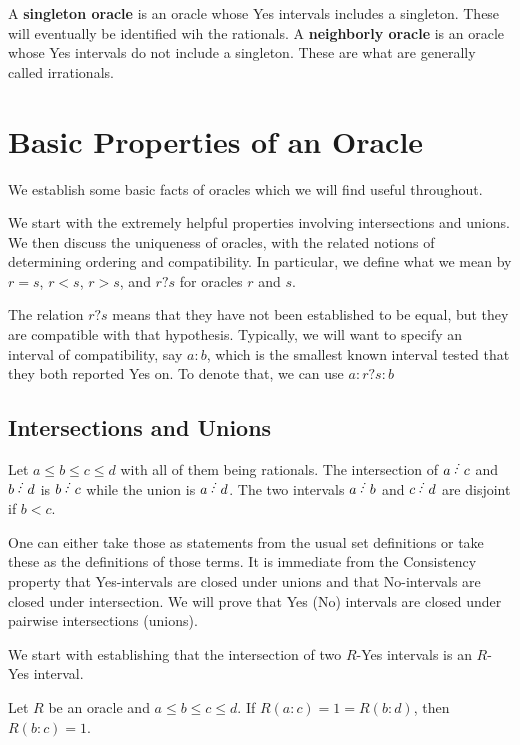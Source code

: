 \documentclass[12pt]{article}
\begin{document}
A \textbf{singleton oracle }is an oracle whose Yes intervals includes a singleton. These will eventually be identified wih the rationals. A \textbf{neighborly oracle} is an oracle whose Yes intervals do not include a singleton. These are what are generally called irrationals. 



\section{Basic Properties of an Oracle}

We establish some basic facts of oracles which we will find useful throughout. 

We start with the extremely helpful properties involving intersections and unions. We then discuss the uniqueness of oracles, with the related notions of determining ordering and compatibility. In particular, we define what we mean by $r = s$, $r<s$, $r>s$, and $r?s$ for oracles $r$ and $s$. 

The relation $r?s$ means that they have not been established to be equal, but they are compatible with that hypothesis. Typically, we will want to specify an interval of compatibility, say $a:b$, which is the smallest known interval tested that they both reported Yes on. To denote that, we can use $a:r?s:b$ 

\subsection{Intersections and Unions}

Let $a \leq b \leq c \leq d$ with all of them being rationals. The intersection of $a\lte c$ and $b\lte d$ is $b\lte c$ while the union is $a\lte d$. The two intervals $a\lte b$ and $c\lte d$ are disjoint if $b < c$. 

One can either take those as statements from the usual set definitions or take these as the definitions of those terms. It is immediate from the Consistency property that Yes-intervals are closed under unions and that No-intervals are closed under intersection. We will prove that Yes (No) intervals are closed under pairwise intersections (unions). 

We start with establishing that the intersection of two $R$-Yes intervals is an $R$-Yes interval.

\begin{proposition}\label{pr:inter}
Let $R$ be an oracle and $a \leq b \leq c \leq d$. If $R(a:c) = 1 = R(b:d)$, then $R(b:c) = 1$.
\end{proposition}
\end{document}
